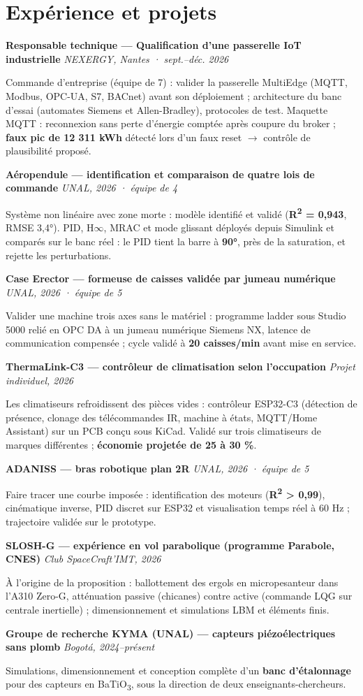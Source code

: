 \documentclass[10pt,a4paper]{article}
\newcommand{\entree}[3]{%
  \textbf{#1}\hfill{\small\itshape\color{grey} #2}\par\vspace{0.5pt}
  {\small #3}\par\vspace{4pt}}
\newcommand{\bati}{BaTiO\textsubscript{3}}
\begin{document}
\section{Expérience et projets}
\entree{Responsable technique — Qualification d'une passerelle IoT industrielle}{NEXERGY, Nantes · sept.–déc. 2026}{%
Commande d'entreprise (équipe de 7) : valider la passerelle MultiEdge (MQTT, Modbus, OPC-UA, S7, BACnet) avant son déploiement ;
architecture du banc d'essai (automates Siemens et Allen-Bradley), protocoles de test. Maquette MQTT : reconnexion sans perte d'énergie comptée après coupure
du broker ; \textbf{faux pic de 12 311 kWh} détecté lors d'un faux reset $\rightarrow$ contrôle de plausibilité proposé.}
\entree{Aéropendule — identification et comparaison de quatre lois de commande}{UNAL, 2026 · équipe de 4}{%
Système non linéaire avec zone morte : modèle identifié et validé (\textbf{R\textsuperscript{2} = 0,943}, RMSE 3,4°). PID, H$\infty$, MRAC
et mode glissant déployés depuis Simulink et comparés sur le banc réel : le PID tient la barre à \textbf{90°}, près de la saturation,
et rejette les perturbations.}
\entree{Case Erector — formeuse de caisses validée par jumeau numérique}{UNAL, 2026 · équipe de 5}{%
Valider une machine trois axes sans le matériel : programme ladder sous Studio 5000 relié en OPC DA à un jumeau numérique
Siemens NX, latence de communication compensée ; cycle validé à \textbf{20 caisses/min} avant mise en service.}
\entree{ThermaLink-C3 — contrôleur de climatisation selon l'occupation}{Projet individuel, 2026}{%
Les climatiseurs refroidissent des pièces vides : contrôleur ESP32-C3 (détection de présence, clonage des télécommandes IR, machine
à états, MQTT/Home Assistant) sur un PCB conçu sous KiCad. Validé sur trois climatiseurs de marques différentes ;
\textbf{économie projetée de 25 à 30 \%}.}
\entree{ADANISS — bras robotique plan 2R}{UNAL, 2026 · équipe de 5}{%
Faire tracer une courbe imposée : identification des moteurs (\textbf{R\textsuperscript{2} > 0,99}), cinématique inverse, PID discret
sur ESP32 et visualisation temps réel à 60 Hz ; trajectoire validée sur le prototype.}
\entree{SLOSH-G — expérience en vol parabolique (programme Parabole, CNES)}{Club SpaceCraft'IMT, 2026}{%
À l'origine de la proposition : ballottement des ergols en micropesanteur dans l'A310 Zero-G, atténuation passive (chicanes)
contre active (commande LQG sur centrale inertielle) ; dimensionnement et simulations LBM et éléments finis.}
\entree{Groupe de recherche KYMA (UNAL) — capteurs piézoélectriques sans plomb}{Bogotá, 2024–présent}{%
Simulations, dimensionnement et conception complète d'un \textbf{banc d'étalonnage} pour des capteurs en \bati,
sous la direction de deux enseignants-chercheurs.}
\end{document}
